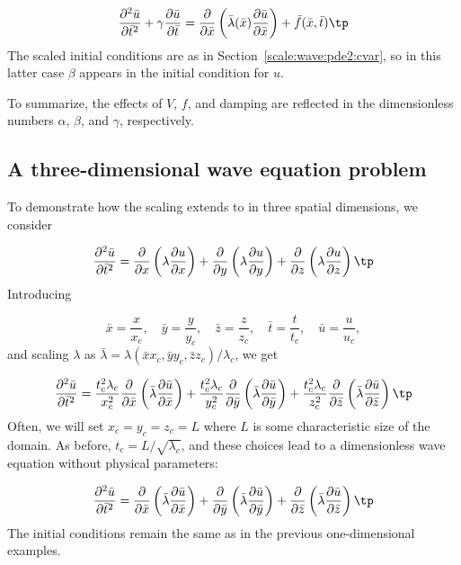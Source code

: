 \documentclass[graybox,envcountchap,sectrefs,final]{svmonodo}
\begin{document}
\begin{equation}
\frac{\partial^2 \bar u}{\partial \bar t^2}
+ \gamma\frac{\partial \bar u}{\partial \bar t} =
\frac{\partial}{\partial \bar x}\left(
\bar \lambda(\bar x) {\partial\bar u\over\partial\bar x}\right) +
\bar f(\bar x,\bar t)\tp
\end{equation}
The scaled initial conditions are as in
Section~\ref{scale:wave:pde2:cvar}, so in this latter case
$\beta$ appears in the initial condition for $u$.

To summarize, the effects of $V$, $f$, and damping are reflected in
the dimensionless numbers $\alpha$, $\beta$, and $\gamma$,
respectively.

\subsection{A three-dimensional wave equation problem}

To demonstrate how the scaling extends to in three spatial dimensions,
we consider

\begin{equation}
\frac{\partial^2 \bar u}{\partial \bar t^2} =
\frac{\partial}{\partial x}\left(\lambda\frac{\partial u}{\partial x}\right)+
\frac{\partial}{\partial y}\left(\lambda\frac{\partial u}{\partial y}\right)+
\frac{\partial}{\partial z}\left(\lambda\frac{\partial u}{\partial z}\right)\tp
\end{equation}
Introducing

\[ \bar x = \frac{x}{x_c},\quad \bar y = \frac{y}{y_c},
   \quad \bar z = \frac{z}{z_c},
   \quad \bar t = \frac{t}{t_c}, \quad \bar u =\frac{u}{u_c},\]
and scaling $\lambda$ as
$\bar\lambda = \lambda(\bar xx_c, \bar y y_c, \bar z z_c)/\lambda_c$,
we get

\[
\frac{\partial^2 \bar u}{\partial \bar t^2} =
\frac{t_c^2\lambda_c}{x_c^2}\frac{\partial}{\partial \bar x}\left(\bar\lambda\frac{\partial \bar u}{\partial \bar x}\right)+
\frac{t_c^2\lambda_c}{y_c^2}\frac{\partial}{\partial \bar y}\left(\bar\lambda\frac{\partial \bar u}{\partial \bar y}\right)+
\frac{t_c^2\lambda_c}{z_c^2}\frac{\partial}{\partial \bar z}\left(\bar\lambda\frac{\partial \bar u}{\partial \bar z}\right)\tp
\]
Often, we will set $x_c=y_c=z_c=L$ where $L$ is some characteristic
size of the domain.
As before, $t_c = L/\sqrt{\lambda_c}$, and these choices lead to a
dimensionless wave equation without physical parameters:

\begin{equation}
\frac{\partial^2 \bar u}{\partial \bar t^2} =
\frac{\partial}{\partial \bar x}\left(\bar\lambda\frac{\partial \bar u}{\partial \bar x}\right)+
\frac{\partial}{\partial \bar y}\left(\bar\lambda\frac{\partial \bar u}{\partial \bar y}\right)+
\frac{\partial}{\partial \bar z}\left(\bar\lambda\frac{\partial \bar u}{\partial \bar z}\right)\tp
\end{equation}
The initial conditions remain the same as in the previous one-dimensional
examples.
\end{document}

